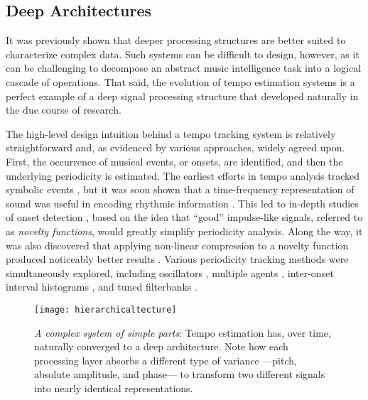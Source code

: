 \subsection{Deep Architectures}
\label{subsec:deep_architectures}

It was previously shown that deeper processing structures are better suited to characterize complex data.
Such systems can be difficult to design, however, as it can be challenging to decompose an abstract music intelligence task into a logical cascade of operations.
That said, the evolution of tempo estimation systems is a perfect example of a deep signal processing structure that developed naturally in the due course of research.

The high-level design intuition behind a tempo tracking system is relatively straightforward and, as evidenced by various approaches, widely agreed upon.
First, the occurrence of musical events, or onsets, are identified, and then the underlying periodicity is estimated.
The earliest efforts in tempo analysis tracked symbolic events \cite{Dannenberg1984Online}, but it was soon shown that a time-frequency representation of sound was useful in encoding rhythmic information \cite{Scheirer1998Tempo}.
This led to in-depth studies of onset detection \cite{Bello2005Tutorial}, based on the idea that ``good'' impulse-like signals, referred to as \emph{novelty functions}, would greatly simplify periodicity analysis.
Along the way, it was also discovered that applying non-linear compression to a novelty function produced noticeably better results \cite{Klapuri2006Analysis}.
Various periodicity tracking methods were simultaneously explored, including oscillators \cite{Large1994Resonance}, multiple agents \cite{Goto1995Realtime}, inter-onset interval histograms \cite{Dixon2007Evaluation}, and tuned filterbanks \cite{Grosche2011Extracting}.

\begin{figure}
\begin{centering}
\texttt{[image: hierarchicaltecture]}
\caption{\emph{A complex system of simple parts}: Tempo estimation has, over time, naturally converged to a deep architecture. Note how each processing layer absorbs a different type of variance ---pitch, absolute amplitude, and phase--- to transform two different signals into nearly identical representations.}
\label{fig:hierarchicaltecture}
\end{centering}
\end{figure}

